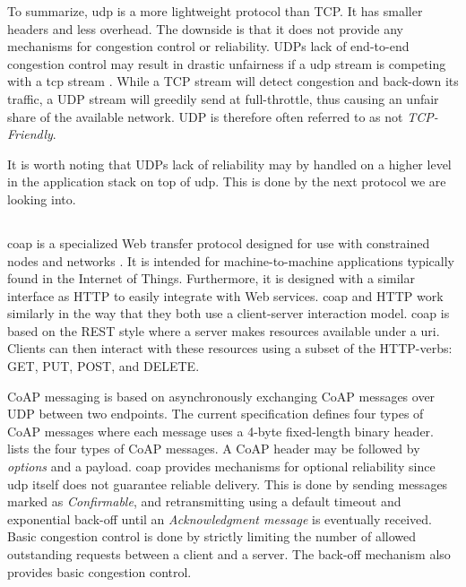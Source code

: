 To summarize, \gls{udp} is a more lightweight protocol than TCP. It has smaller
headers and less overhead. The downside is that it does not provide any
mechanisms for congestion control or reliability. UDPs lack of end-to-end
congestion control may result in drastic unfairness if a \gls{udp} stream is
competing with a \gls{tcp} stream \cite{floyd-congestion}. While a TCP stream
will detect congestion and back-down its traffic, a UDP stream will greedily
send at full-throttle, thus causing an unfair share of the available network.
UDP is therefore often referred to as not \textit{TCP-Friendly}.

 It is worth noting that UDPs lack of reliability may by handled on a higher
 level in the application stack on top of \gls{udp}. This is done by the next
 protocol we are looking into.

\subsection{}

\gls{coap} is a specialized Web transfer protocol designed for use with
constrained nodes and  networks \cite{rfc-7252}. It is intended for
machine-to-machine applications typically found in the Internet of Things.
Furthermore, it is designed with a similar interface as HTTP to easily integrate
with Web services. \gls{coap} and HTTP work similarly in the way that they both
use a client-server interaction model. \Gls{coap} is based on the REST style
where a server makes resources available under a \gls{uri}. Clients can then
interact with these resources using a subset of the HTTP-verbs: GET, PUT, POST,
and DELETE.

CoAP messaging is based on asynchronously exchanging CoAP messages over UDP
between two endpoints. The current specification defines four types of CoAP
messages where each message uses a 4-byte fixed-length binary header.
 lists the four types of CoAP messages. A CoAP header
may be followed by \textit{options} and a payload. \Gls{coap} provides
mechanisms for optional reliability since \gls{udp} itself does not guarantee
reliable delivery. This is done by sending messages marked as
\textit{Confirmable}, and retransmitting using a default timeout and exponential
back-off until an \textit{Acknowledgment message} is eventually received. Basic
congestion control is done by strictly limiting the number of allowed
outstanding requests between a client and a server. The back-off mechanism also
provides basic congestion control.

